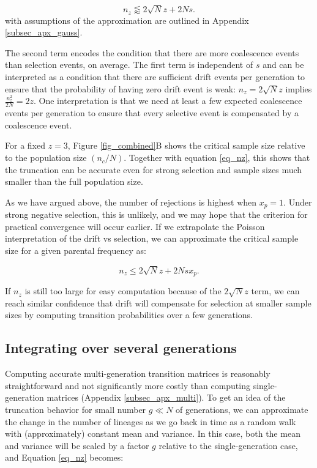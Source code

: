 \documentclass[review,nonatbib]{elsarticle}
\begin{document}
\begin{equation}
  n_z \lessapprox 2 \sqrt{N} z + 2N s.
\label{eq_nz}
\end{equation}
with assumptions of the approximation are outlined in Appendix \ref{subsec_apx_gauss}. 

The second term
encodes the condition that there are more coalescence events than selection events, on average. The
first term is independent of $s$ and can be interpreted as a condition that there are sufficient
drift events per generation to ensure that the probability of having zero drift event is weak: $n_z
= 2 \sqrt N z$ implies $\frac{n_z^2}{2N}= 2 z$. One interpretation is that we need at least a few
expected coalescence events per generation to ensure that every selective event is compensated by a
coalescence event. 

 For a fixed $z=3$, Figure \ref{fig_combined}B shows the critical sample size relative to the population size 
 $(n_c/N)$. Together with equation \ref{eq_nz}, this shows
that the truncation can be accurate even for strong selection and sample sizes much smaller than
the full population size. 

As we have argued above, the number of rejections is highest when $x_p=1$. 
Under strong  negative selection, this is unlikely, and we may hope that the
criterion for practical convergence will occur earlier. 
If we extrapolate the Poisson interpretation of the drift vs selection, 
we can approximate the critical sample size for a given parental frequency as:

\begin{equation*}
  n_z \leq 2 \sqrt{N} z + 2Nsx_p.
\end{equation*}

If $n_z$ is still too large for easy computation because of the $2 \sqrt{N} z$ term, we 
can reach similar confidence that drift will compensate for selection at smaller sample sizes
by computing transition probabilities over a few generations. 

\subsection{Integrating over several generations} 

Computing accurate multi-generation transition matrices is reasonably straightforward 
and not significantly more costly than computing single-generation matrices 
(Appendix \ref{subsec_apx_multi}). To get an idea of the truncation behavior 
for small number $g \ll N$ of generations, we can approximate the change  in the number 
of lineages as we go back in time as a random walk with (approximately) constant mean and 
variance. In this case, both the mean and variance will be scaled by a factor $g$ relative 
to the single-generation case, and Equation \eqref{eq_nz} becomes:
\end{document}
